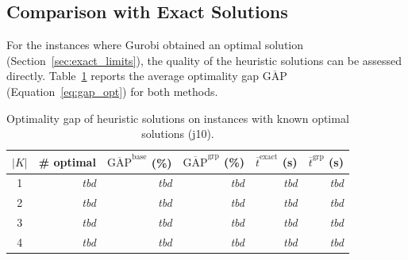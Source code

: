 
\subsection{Comparison with Exact Solutions}
\label{subsec:gap_exact}



For the instances where Gurobi obtained an optimal solution
(Section~\ref{sec:exact_limits}), the quality of the heuristic
solutions can be assessed directly. Table~\ref{tab:gap_exact}
reports the average optimality gap $\overline{\mathrm{GAP}}$
(Equation~\ref{eq:gap_opt}) for both methods.

\begin{table}[htbp]
\centering
\renewcommand{\arraystretch}{1.35}
\caption{Optimality gap of heuristic solutions on instances
         with known optimal solutions (j10).}
\label{tab:gap_exact}
\begin{tabular}{c r r r r r}
\hline
$|K|$ &
\# optimal &
$\overline{\mathrm{GAP}}^{\mathrm{base}}$ (\%) &
$\overline{\mathrm{GAP}}^{\mathrm{grp}}$ (\%) &
$\overline{t}^{\mathrm{exact}}$ (s) &
$\overline{t}^{\mathrm{grp}}$ (s) \\
\hline
1 & \textit{tbd} & \textit{tbd} & \textit{tbd}
  & \textit{tbd} & \textit{tbd} \\
2 & \textit{tbd} & \textit{tbd} & \textit{tbd}
  & \textit{tbd} & \textit{tbd} \\
3 & \textit{tbd} & \textit{tbd} & \textit{tbd}
  & \textit{tbd} & \textit{tbd} \\
4 & \textit{tbd} & \textit{tbd} & \textit{tbd}
  & \textit{tbd} & \textit{tbd} \\
\hline
\end{tabular}
\end{table}



